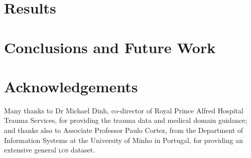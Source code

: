 \documentclass[portrait]{usydposter}
\newcommand{\acronym}[1]{\textsc{#1}\xspace}
\newcommand{\los}{\acronym{los}}
\begin{document}
\begin{multicols}{3}
\section{Results}
\noindent

\section{Conclusions and Future Work}
\noindent

\section{Acknowledgements}
\noindent
Many thanks to Dr Michael Dinh, co-director of Royal Prince Alfred
Hospital Trauma Services, for providing the trauma data and medical domain
guidance; and thanks also to Associate Professor Paulo Cortez, from the
Department of Information Systems at the University of
Minho in Portugal, for providing an extensive general \los dataset.
\\




\end{multicols}
\end{document}

